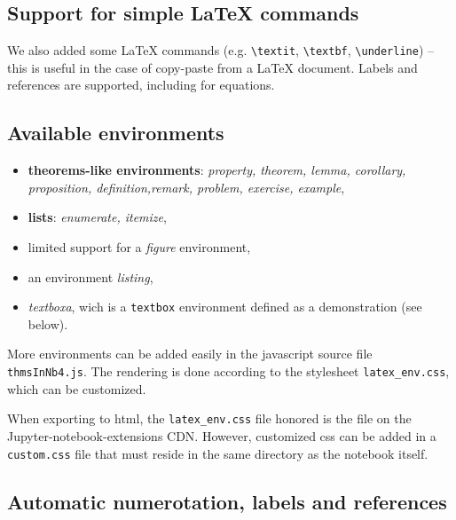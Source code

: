     \subsection{Support for simple LaTeX
commands}\label{support-for-simple-latex-commands}

    We also added some LaTeX commands (e.g. \texttt{\textbackslash{}textit},
\texttt{\textbackslash{}textbf}, \texttt{\textbackslash{}underline}) --
this is useful in the case of copy-paste from a LaTeX document. Labels
and references are supported, including for equations.

    \subsection{Available environments}\label{available-environments}

    \begin{itemize}
\tightlist
\item
  \textbf{theorems-like environments}: \emph{property, theorem, lemma,
  corollary, proposition, definition,remark, problem, exercise,
  example},
\item
  \textbf{lists}: \emph{enumerate, itemize},\\
\item
  limited support for a \emph{figure} environment,
\item
  an environment \emph{listing},
\item
  \emph{textboxa}, wich is a \texttt{textbox} environment defined as a
  demonstration (see below).
\end{itemize}

More environments can be added easily in the javascript source file
\texttt{thmsInNb4.js}. The rendering is done according to the stylesheet
\texttt{latex\_env.css}, which can be customized.

\begin{remark} When exporting to html, the
\texttt{latex\_env.css} file honored is the file on the
Jupyter-notebook-extensions CDN. However, customized css can be added in
a \texttt{custom.css} file that must reside in the same directory as the
notebook itself. \end{remark}

    \subsection{Automatic numerotation, labels and
references}\label{automatic-numerotation-labels-and-references}

